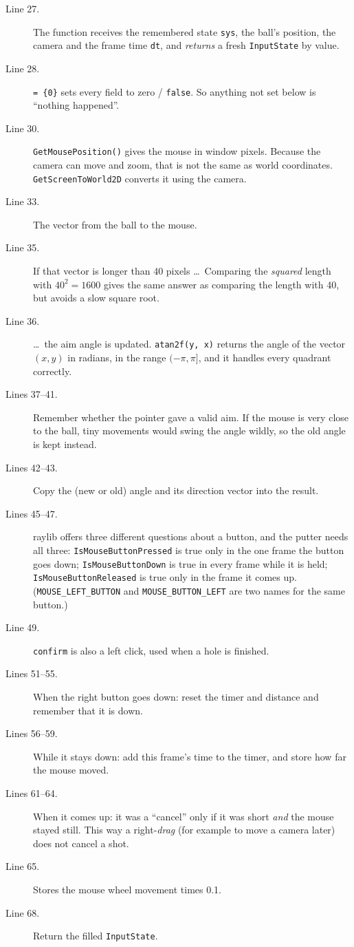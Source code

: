 \documentclass[11pt,a4paper]{article}
\begin{document}
\begin{description}
  \item[Line 27.] The function receives the remembered state \texttt{sys}, the ball's position, the camera and the
  frame time \texttt{dt}, and \emph{returns} a fresh \texttt{InputState} by value.
  \item[Line 28.] \texttt{= \{0\}} sets every field to zero / \texttt{false}. So anything not set below is ``nothing
  happened''.
  \item[Line 30.] \texttt{GetMousePosition()} gives the mouse in window pixels. Because the camera can move and
  zoom, that is not the same as world coordinates. \texttt{GetScreenToWorld2D} converts it using the camera.
  \item[Line 33.] The vector from the ball to the mouse.
  \item[Line 35.] If that vector is longer than 40 pixels \dots\ Comparing the \emph{squared} length with
  $40^2 = 1600$ gives the same answer as comparing the length with 40, but avoids a slow square root.
  \item[Line 36.] \dots\ the aim angle is updated. \texttt{atan2f(y, x)} returns the angle of the vector
  $(x,y)$ in radians, in the range $(-\pi, \pi]$, and it handles every quadrant correctly.
  \item[Lines 37--41.] Remember whether the pointer gave a valid aim. If the mouse is very close to the ball,
  tiny movements would swing the angle wildly, so the old angle is kept instead.
  \item[Lines 42--43.] Copy the (new or old) angle and its direction vector into the result.
  \item[Lines 45--47.] raylib offers three different questions about a button, and the putter needs all three:
  \texttt{IsMouseButtonPressed} is true only in the one frame the button goes down;
  \texttt{IsMouseButtonDown} is true in every frame while it is held;
  \texttt{IsMouseButtonReleased} is true only in the frame it comes up.
  (\texttt{MOUSE\_LEFT\_BUTTON} and \texttt{MOUSE\_BUTTON\_LEFT} are two names for the same button.)
  \item[Line 49.] \texttt{confirm} is also a left click, used when a hole is finished.
  \item[Lines 51--55.] When the right button goes down: reset the timer and distance and remember that it is down.
  \item[Lines 56--59.] While it stays down: add this frame's time to the timer, and store how far the mouse moved.
  \item[Lines 61--64.] When it comes up: it was a ``cancel'' only if it was short \emph{and} the mouse stayed still.
  This way a right-\emph{drag} (for example to move a camera later) does not cancel a shot.
  \item[Line 65.] Stores the mouse wheel movement times 0.1.
  \item[Line 68.] Return the filled \texttt{InputState}.
\end{description}
\end{document}
